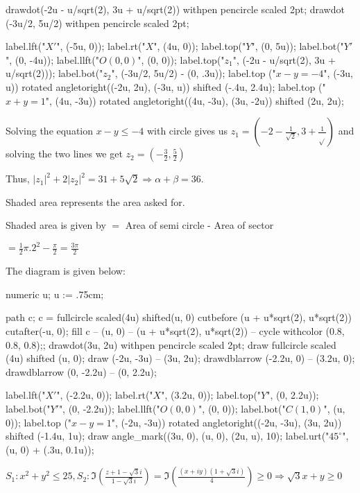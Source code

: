       drawdot(-2u - u/sqrt(2), 3u + u/sqrt(2)) withpen pencircle scaled 2pt;
      drawdot (-3u/2, 5u/2) withpen pencircle scaled 2pt;

      label.lft("$X'$", (-5u, 0));
      label.rt("$X$", (4u, 0));
      label.top("$Y$", (0, 5u));
      label.bot("$Y'$", (0, -4u));
      label.llft("$O(0, 0)$", (0, 0));
      label.top("$z_1$", (-2u - u/sqrt(2), 3u + u/sqrt(2)));
      label.bot("$z_2$", (-3u/2, 5u/2) - (0, .3u));
      label.top ("$x - y = -4$", (-3u, u)) rotated angletoright((-2u, 2u), (-3u, u)) shifted (-.4u, 2.4u);
      label.top ("$x + y = 1$", (4u, -3u)) rotated angletoright((4u, -3u), (3u, -2u)) shifted (2u, 2u);
    \stopMPcode
  \stopplacefigure

  Solving the equation $x - y\leq -4$ with circle gives us $z_1 = \left(-2 -\frac{1}{\sqrt{2}}, 3
  + \frac{1}{\sqrt{}}\right)$ and solving the two lines we get $z_2
  = \left(-\frac{3}{2}, \frac{5}{2}\right)$

  Thus, $|z_1|^2 + 2|z_2|^2 = 31 + 5\sqrt{2}\Rightarrow \alpha + \beta = 36$.
\item Shaded area represents the area asked for.

  Shaded area is given by $=$ Area of semi circle - Area of sector

  $= \frac{1}{2}\pi.2^2 - \frac{\pi}{2} = \frac{3\pi}{2}$

  The diagram is given below:

  \startplacefigure[location=force]
    \startMPcode
      numeric u;
      u := .75cm;

      path c;
      c = fullcircle scaled(4u) shifted(u, 0) cutbefore (u + u*sqrt(2), u*sqrt(2)) cutafter(-u, 0);
      fill c -- (u, 0) -- (u + u*sqrt(2), u*sqrt(2)) -- cycle withcolor (0.8, 0.8, 0.8);;
      drawdot(3u, 2u) withpen pencircle scaled 2pt;
      draw fullcircle scaled (4u) shifted (u, 0);
      draw (-2u, -3u) -- (3u, 2u);
      drawdblarrow (-2.2u, 0) -- (3.2u, 0);
      drawdblarrow (0, -2.2u) -- (0, 2.2u);

      label.lft("$X'$", (-2.2u, 0));
      label.rt("$X$", (3.2u, 0));
      label.top("$Y$", (0, 2.2u));
      label.bot("$Y'$", (0, -2.2u));
      label.llft("$O(0, 0)$", (0, 0));
      label.bot("$C(1, 0)$", (u, 0));
      label.top ("$x - y = 1$", (-2u, -3u)) rotated angletoright((-2u, -3u), (3u, 2u)) shifted (-1.4u, 1u);
      draw angle_mark((3u, 0), (u, 0), (2u, u), 10);
      label.urt("$45^\circ$", (u, 0) + (.3u, 0.1u));
    \stopMPcode
  \stopplacefigure
\item $S_1: x^2 + y^2\leq 25, S_2: \Im\left(\frac{z + 1 - \sqrt{3}i}{1 - \sqrt{3}i}\right)
  = \Im\left(\frac{(x + iy)(1 + \sqrt{3}i)}{4}\right)\geq 0\Rightarrow \sqrt{3}x + y\geq 0$

